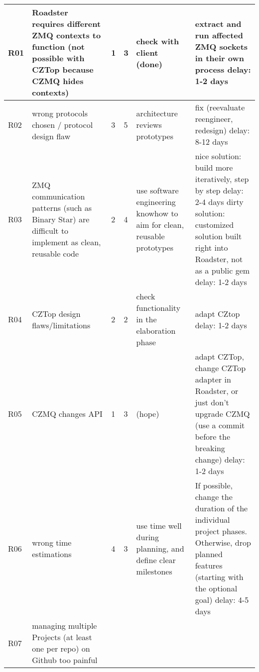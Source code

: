 \begin{center}
\begin{longtable}{|p{6mm}|p{30mm}|p{6mm}|p{8mm}|p{30mm}|p{64mm}|}
    \hline
    \endlastfoot
    R01
		& Roadster requires different ZMQ contexts to function (not possible with CZTop because CZMQ hides contexts)
		& \cellcolor{green!50}1
		& \cellcolor{green!50}3
		& check with client	(done)
		& extract and run affected ZMQ \newline sockets in their own process \newline delay: 1-2 days \\ \hline
	R02 
		& wrong protocols chosen / protocol design flaw
		& \cellcolor{orange!50}3
		& \cellcolor{orange!50}5
		& architecture \newline reviews prototypes
		& fix (reevaluate reengineer, redesign) \newline delay: 8-12 days	\\ \hline
	R03 
		& ZMQ communication patterns (such as Binary Star) are difficult to implement as clean, reusable code
		& \cellcolor{yellow!50}2 
		& \cellcolor{yellow!50}4 
		& use software engineering knowhow to aim for clean, reusable prototypes
		& nice solution: \newline build more iteratively, step by step \newline delay: 2-4 days \newline \newline dirty solution: 
		\newline customized solution built right into Roadster, not as a public gem \newline delay: 1-2 days \\ \hline
	R04	
		& CZTop design flaws/limitations
		& \cellcolor{green!50}2
		& \cellcolor{green!50}2
		& check functionality in the elaboration phase
		& adapt CZtop \newline delay: 1-2 days \\ \hline		
	R05 
		& CZMQ changes API
		& \cellcolor{green!50}1
		& \cellcolor{green!50}3
		& (hope)
		& adapt CZTop, change CZTop adapter in Roadster, or just don't upgrade CZMQ (use a commit before the breaking change) \newline delay: 1-2 days \\ \hline
	R06 
		& wrong time estimations
		& \cellcolor{yellow!50}4
		& \cellcolor{yellow!50}3
		& use time well during planning, and define clear milestones
		& If possible, change the duration of the individual project phases. Otherwise, drop planned features
		(starting with the optional goal) \newline delay: 4-5 days \\ \hline		
	R07 
		& managing multiple Projects (at least one per repo) on Github too painful

\end{longtable}
\end{center}
